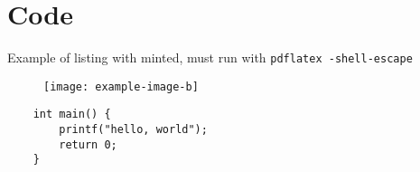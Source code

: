 \chapter{Code}

\lipsum[1-4]

Example of listing with minted, must run with \texttt{pdflatex -shell-escape}
\begin{figure}
	\center
	\texttt{[image: example-image-b]}
\end{figure}

\lipsum[5-7]

\begin{verbatim}
	int main() {
		printf("hello, world");
		return 0;
	}
\end{verbatim}
